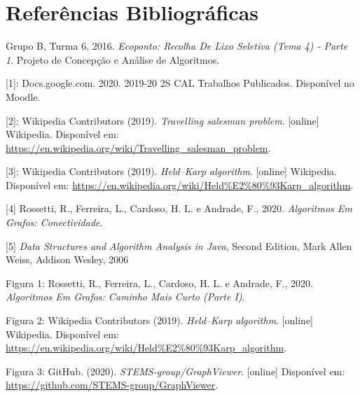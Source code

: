 \documentclass[article, a4paper, 12pt, oneside]{memoir}
\begin{document}
\newpage
\chapter[Referências Bibliográficas][Referências Bibliográficas]{Referências Bibliográficas} \label{\thechapter}
Grupo B, Turma 6, 2016. \textit{Ecoponto: Recolha De Lixo Seletiva (Tema 4) ‐ Parte 1}. Projeto de Concepção e Análise de Algoritmos.

[1]: Docs.google.com. 2020. 2019-20 2S CAL Trabalhos Publicados. Disponível no Moodle.

[2]: Wikipedia Contributors (2019). \textit{Travelling salesman problem}. [online] Wikipedia. Disponível em: \url{https://en.wikipedia.org/wiki/Travelling_salesman_problem}.

[3]: Wikipedia Contributors (2019). \textit{Held–Karp algorithm}. [online] Wikipedia. Disponível em: \url{https://en.wikipedia.org/wiki/Held%E2%80%93Karp_algorithm}.

[4] Rossetti, R., Ferreira, L., Cardoso, H. L. e Andrade, F., 2020. \textit{Algoritmos Em Grafos: Conectividade}.

[5] \textit{Data Structures and Algorithm Analysis in Java}, Second
Edition, Mark Allen Weiss, Addison Wesley, 2006 

Figura 1: Rossetti, R., Ferreira, L., Cardoso, H. L. e Andrade, F., 2020. \textit{Algoritmos Em Grafos: Caminho Mais Curto (Parte I)}.

Figura 2: Wikipedia Contributors (2019). \textit{Held–Karp algorithm}. [online] Wikipedia. Disponível em: \url{https://en.wikipedia.org/wiki/Held%E2%80%93Karp_algorithm}.

Figura 3: GitHub. (2020). \textit{STEMS-group/GraphViewer}. [online] Disponível em: \url{https://github.com/STEMS-group/GraphViewer}.

‌

‌

\newpage
\end{document}
